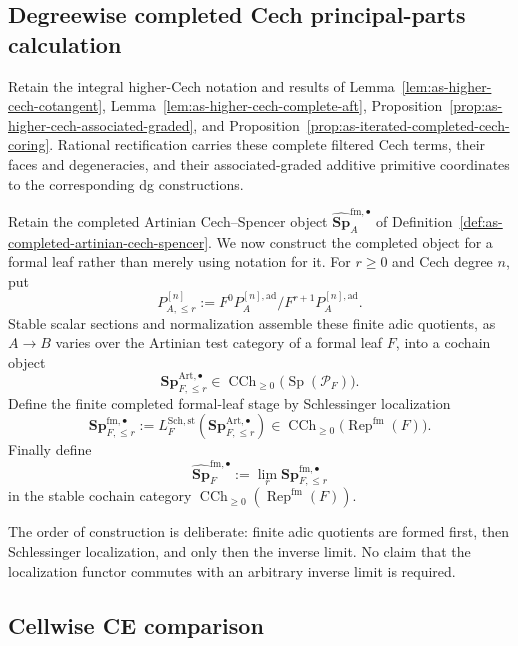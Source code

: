 \subsection{Degreewise completed Cech principal-parts calculation}

Retain the integral higher-Cech notation and results of
Lemma~\ref{lem:as-higher-cech-cotangent},
Lemma~\ref{lem:as-higher-cech-complete-aft},
Proposition~\ref{prop:as-higher-cech-associated-graded}, and
Proposition~\ref{prop:as-iterated-completed-cech-coring}.  Rational
rectification carries these complete filtered Cech terms, their faces and
degeneracies, and their associated-graded additive primitive coordinates to
the corresponding dg constructions.

\begin{construction}
\label{con:as-completed-artinian-spencer}
Retain the completed Artinian Cech--Spencer object
$\widehat{\mathbf{Sp}}_{A}^{\mathrm{fm},\bullet}$ of
Definition~\ref{def:as-completed-artinian-cech-spencer}.  We now construct the
completed object for a formal leaf rather than merely using notation for it.
For $r\geq0$ and Cech degree $n$, put
\[
    P_{A,\le r}^{[n]}
    :=
    F^0P_A^{[n],\mathrm{ad}}/F^{r+1}P_A^{[n],\mathrm{ad}}.
\]
Stable scalar sections and normalization assemble these finite adic quotients,
as $A\to B$ varies over the Artinian test category of a formal leaf $F$, into
a cochain object
\[
    \mathbf{Sp}^{\mathrm{Art},\bullet}_{F,\le r}
    \in
    \operatorname{CCh}_{\geq0}
    \bigl(\operatorname{Sp}(\mathcal P_F)\bigr).
\]
Define the finite completed formal-leaf stage by Schlessinger localization
\[
\boxed{
    \mathbf{Sp}^{\mathrm{fm},\bullet}_{F,\le r}
    :=
    L_F^{\mathrm{Sch,st}}
    \left(
        \mathbf{Sp}^{\mathrm{Art},\bullet}_{F,\le r}
    \right)
    \in
    \operatorname{CCh}_{\geq0}
    \bigl(\operatorname{Rep}^{\mathrm{fm}}(F)\bigr).
}
\]
Finally define
\[
\boxed{
    \widehat{\mathbf{Sp}}_{F}^{\mathrm{fm},\bullet}
    :=
    \lim_r
    \mathbf{Sp}^{\mathrm{fm},\bullet}_{F,\le r}
}
\]
in the stable cochain category
$\operatorname{CCh}_{\geq0}(\operatorname{Rep}^{\mathrm{fm}}(F))$.

The order of construction is deliberate: finite adic quotients are formed
first, then Schlessinger localization, and only then the inverse limit.  No
claim that the localization functor commutes with an arbitrary inverse limit
is required.
\end{construction}

\subsection{Cellwise CE comparison}

